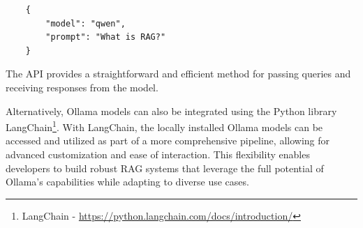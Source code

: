 \begin{verbatim}
	{
		"model": "qwen",
		"prompt": "What is RAG?"
	}
\end{verbatim}

The API provides a straightforward and efficient method for passing queries and receiving responses from the model. 

Alternatively, Ollama models can also be integrated using the Python library LangChain\footnote{LangChain - \url{https://python.langchain.com/docs/introduction/}}. With LangChain, the locally installed Ollama models can be accessed and utilized as part of a more comprehensive pipeline, allowing for advanced customization and ease of interaction. This flexibility enables developers to build robust RAG systems that leverage the full potential of Ollama's capabilities while adapting to diverse use cases.







